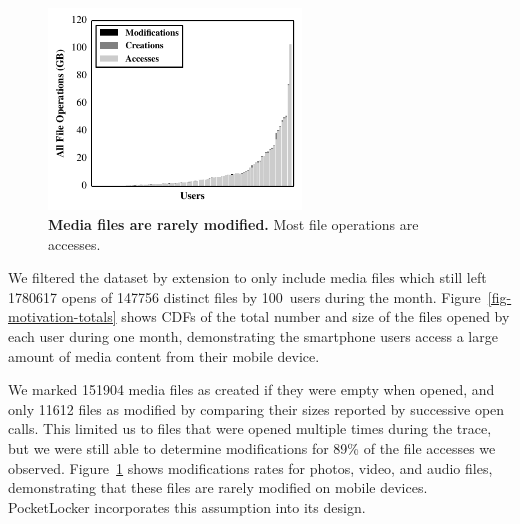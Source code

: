 \begin{figure}

\vspace*{-0.45in}

\includegraphics[width=0.6\textwidth]{./figures/pocketlocker/OperationPercentageGraph.pdf}

\vspace*{-0.1in}

\caption{\small \textbf{Media files are rarely modified.} Most file
operations are accesses.}

\label{fig-motivation-modification}

\vspace*{-0.3in}

\end{figure}

We filtered the dataset by extension to only include media files
which still left \num{1780617} opens of
\num{147756} distinct files by 100~users during the month.
Figure~\ref{fig-motivation-totals} shows CDFs of the total number and size of
the files opened by each \PhoneLab{} user during one month, demonstrating the
smartphone users access a large amount of media content from their mobile
device.

We marked \num{151904} media files as created if they were empty when opened,
and only \num{11612} files as modified by comparing their sizes reported by
successive open calls. This limited us to files that were opened multiple
times during the trace, but we were still able to determine modifications for
89\% of the file accesses we observed.
Figure~\ref{fig-motivation-modification} shows modifications rates for
photos, video, and audio files, demonstrating that these files are rarely
modified on mobile devices. PocketLocker incorporates this assumption into
its design.

